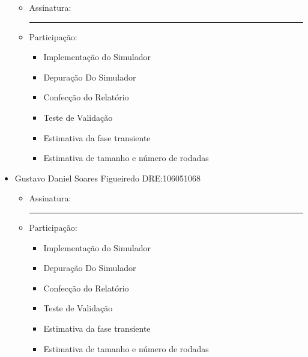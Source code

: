 \documentclass[a4paper,10pt]{article}
\begin{document}
\begin{titlepage}
\begin{itemize}
  \begin{itemize}
    \item Assinatura: \rule{6cm}{.1mm}	
    \item Participação:
    \begin{itemize}
	\item Implementação do Simulador
	\item Depuração Do Simulador
	\item Confecção do Relatório
	\item Teste de Validação
	\item Estimativa da fase transiente
	\item Estimativa de tamanho e número de rodadas
    \end{itemize}
 \end{itemize} 
 \item Gustavo Daniel Soares Figueiredo DRE:106051068 
  \begin{itemize}
    \item Assinatura: \rule{6cm}{.1mm}	
    \item Participação:
    \begin{itemize}
	\item Implementação do Simulador
	\item Depuração Do Simulador
	\item Confecção do Relatório
	\item Teste de Validação
	\item Estimativa da fase transiente
	\item Estimativa de tamanho e número de rodadas
    \end{itemize}
 \end{itemize} 
\end{itemize}
\end{titlepage}

\pagestyle{plain}
\end{document}
